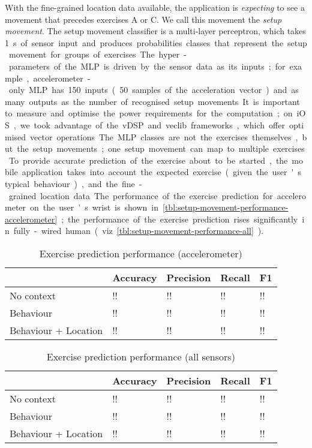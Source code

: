 \documentclass[a4paper, 10 pt, conference]{IEEEtran}
\begin{document}
With the fine-grained location data available, the application is \emph{expecting} to see a movement that precedes exercises A or C. We call this movement the \emph{setup movement}. The setup movement classifier is a multi-layer perceptron, which takes \SI{1}\second of sensor input and produces probabilities classes that represent the setup movement for groups of exercises. The hyper-parameters of the MLP is driven by the sensor data as its inputs; for example, accelerometer-only MLP has 150 inputs (50 samples of the acceleration vector) and as many outputs as the number of recognised setup movements. It is important to measure and optimise the power requirements for the computation; on iOS, we took advantage of the vDSP and veclib frameworks, which offer optimised vector operations. The MLP classes are not the exercises themselves, but the setup movements; one setup movement can map to multiple exercises. To provide accurate prediction of the exercise about to be started, the mobile application takes into account the expected exercise (given the user's typical behaviour), and the fine-grained location data. The performance of the exercise prediction for accelerometer on the user's wrist is shown in \autoref{tbl:setup-movement-performance-accelerometer}; the performance of the exercise prediction rises significantly in fully-wired human (viz \autoref{tbl:setup-movement-performance-all}).

\begin{table}[h]
\caption{Exercise prediction performance (accelerometer)}
\label{tbl:setup-movement-performance-accelerometer}
\begin{center}
\begin{tabular}{|l||m{1cm}|m{1cm}|m{1cm}|m{1cm}|}
\hline                      & Accuracy & Precision & Recall & F1 \\
\hline No context           & !!       & !!        & !!     & !! \\
\hline Behaviour            & !!       & !!        & !!     & !! \\ 
\hline Behaviour + Location & !!       & !!        & !!     & !! \\
\hline
\end{tabular}
\end{center}
\end{table}

\begin{table}[h]
\caption{Exercise prediction performance (all sensors)}
\label{tbl:setup-movement-performance-all}
\begin{center}
\begin{tabular}{|l||m{1cm}|m{1cm}|m{1cm}|m{1cm}|}
\hline                      & Accuracy & Precision & Recall & F1 \\
\hline No context           & !!       & !!        & !!     & !! \\
\hline Behaviour            & !!       & !!        & !!     & !! \\ 
\hline Behaviour + Location & !!       & !!        & !!     & !! \\
\hline
\end{tabular}
\end{center}
\end{table}
\end{document}
